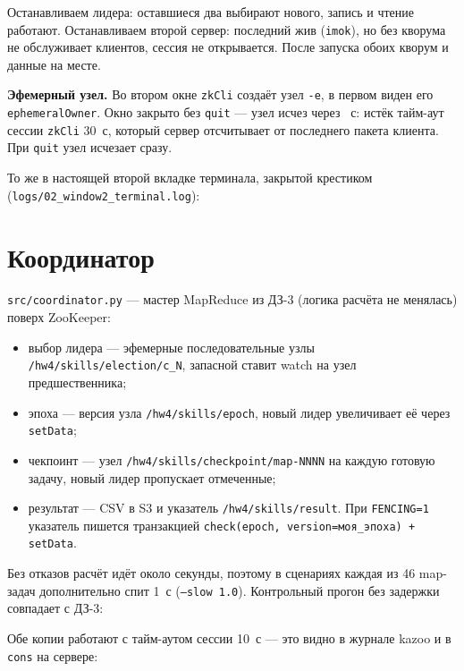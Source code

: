 \documentclass[12pt,a4paper]{article}
\newcommand{\code}[1]{\texttt{#1}}
\begin{document}
Останавливаем лидера: оставшиеся два выбирают нового, запись и чтение работают. Останавливаем второй сервер: последний жив
(\code{imok}), но без кворума не обслуживает клиентов, сессия не открывается. После запуска обоих кворум и данные на месте.



\textbf{Эфемерный узел.} Во втором окне \code{zkCli} создаёт узел \code{-e}, в первом виден его \code{ephemeralOwner}. Окно
закрыто без \code{quit} --- узел исчез через \EphGone~с: истёк тайм-аут сессии \code{zkCli} 30~с, который сервер отсчитывает
от последнего пакета клиента. При \code{quit} узел исчезает сразу.



То же в настоящей второй вкладке терминала, закрытой крестиком (\code{logs/02\_window2\_terminal.log}):



\section{Координатор}

\code{src/coordinator.py} --- мастер MapReduce из ДЗ-3 (логика расчёта не менялась) поверх ZooKeeper:
\begin{itemize}
\item выбор лидера --- эфемерные последовательные узлы \code{/hw4/skills/election/c\_N}, запасной ставит watch на узел предшественника;
\item эпоха --- версия узла \code{/hw4/skills/epoch}, новый лидер увеличивает её через \code{setData};
\item чекпоинт --- узел \code{/hw4/skills/checkpoint/map-NNNN} на каждую готовую задачу, новый лидер пропускает отмеченные;
\item результат --- CSV в S3 и указатель \code{/hw4/skills/result}. При \code{FENCING=1} указатель пишется транзакцией
\code{check(epoch, version=моя\_эпоха) + setData}.
\end{itemize}

Без отказов расчёт идёт около секунды, поэтому в сценариях каждая из 46 map-задач дополнительно спит 1~с (\code{--slow 1.0}).
Контрольный прогон без задержки совпадает с ДЗ-3:



Обе копии работают с тайм-аутом сессии 10~с --- это видно в журнале kazoo и в \code{cons} на сервере:


\end{document}
